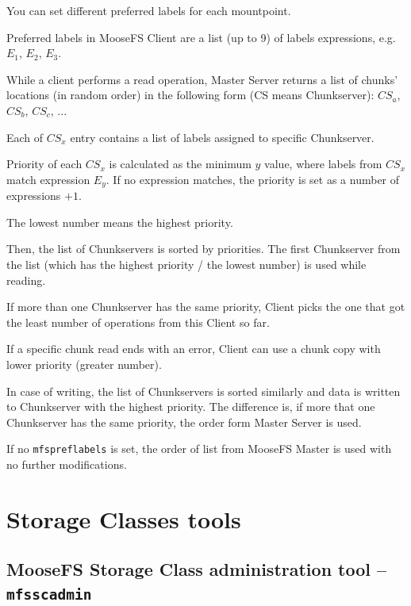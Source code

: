 \documentclass[a4paper,11pt,english]{report}
\def\code#1{\texttt{#1}}
\begin{document}
			You can set different preferred labels for each mountpoint.
			
			Preferred labels in MooseFS Client are a list (up to 9) of labels expressions, e.g. $E_{1}$, $E_{2}$, $E_{3}$.
			
			While a client performs a read operation, Master Server returns a list of chunks' locations (in random order) in the following form (CS means Chunkserver): $CS_{a}$, $CS_{b}$, $CS_{c}$, ...
	
			Each of $CS_{x}$ entry contains a list of labels assigned to specific Chunkserver.
			
			Priority of each $CS_{x}$ is calculated as the minimum $y$ value, where labels from $CS_{x}$ match expression $E_{y}$. If no expression matches, the priority is set as a number of expressions $+1$.
	
			The lowest number means the highest priority.
	
			Then, the list of Chunkservers is sorted by priorities. The first Chunkserver from the list (which has the highest priority / the lowest number) is used while reading.
			
			If more than one Chunkserver has the same priority, Client picks the one that got the least number of operations from this Client so far.
			
			If a specific chunk read ends with an error, Client can use a chunk copy with lower priority (greater number).
	
			In case of writing, the list of Chunkservers is sorted similarly and data is written to Chunkserver with the highest priority. The difference is, if more that one Chunkserver has the same priority, the order form Master Server is used.
			
			If no \code{mfspreflabels} is set, the order of list from MooseFS Master is used with no further modifications.
			
			
			
		\section{Storage Classes tools}
			\label{chapter:storage-classes-tools}
	
			\subsection{MooseFS Storage Class administration tool -- \code{mfsscadmin}}
				\label{section:moosefs-storage-class-administration-tool}
				
\end{document}
